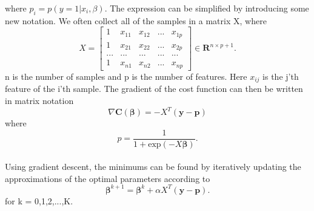 where $p_i = p(y=1|x_i, \beta)$. The expression can be simplified by introducing some new notation. 
We often collect all of the samples in a matrix X, where 
\begin{equation}
    X = \begin{bmatrix}
    1 & x_{11} & x_{12} & ... & x_{1p} \\
    1 & x_{21} & x_{22} & ... & x_{2p} \\
    ... & ... & ... & ... & ... \\
    1 & x_{n1} & x_{n2} & ... & x_{np}
    \end{bmatrix} \in \mathbf{R}^{n \times p+1}.
\end{equation}
n is the number of samples and p is the number of features. 
Here $x_{ij}$ is the j'th feature of the i'th sample. The gradient of the cost function can then be written in matrix notation
\begin{equation}
    \nabla \boldsymbol{C}(\boldsymbol{\beta}) = -X^T(\boldsymbol{y} - \boldsymbol{p})
\end{equation}
where 
\begin{equation}
    p = \frac{1}{1 + \text{exp}(- X\boldsymbol{\beta})}.
\end{equation}
\\
Using gradient descent, the minimums can be found by iteratively updating the approximations of the optimal parameters according to 
\begin{equation}
    \boldsymbol{\beta}^{k+1} = \boldsymbol{\beta}^k +\alpha X^T(\boldsymbol{y}-\boldsymbol{p}).
\end{equation}
for k = 0,1,2,...,K.

